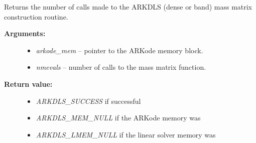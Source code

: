 \documentclass[letterpaper,10pt,english]{sphinxmanual}
\begin{document}
\begin{fulllineitems}
\label{c_interface/User_callable:ARKDlsGetNumMassEvals}
Returns the number of calls made to the ARKDLS
(dense or band) mass matrix construction routine.
\begin{description}
\item[{\textbf{Arguments:}}] \leavevmode\begin{itemize}
\item {} 
\emph{arkode\_mem} -- pointer to the ARKode memory block.

\item {} 
\emph{nmevals} -- number of calls to the mass matrix function.

\end{itemize}

\item[{\textbf{Return value:}}] \leavevmode\begin{itemize}
\item {} 
\emph{ARKDLS\_SUCCESS} if successful

\item {} 
\emph{ARKDLS\_MEM\_NULL} if the ARKode memory was 

\item {} 
\emph{ARKDLS\_LMEM\_NULL} if the linear solver memory was 

\end{itemize}

\end{description}

\end{fulllineitems}

\end{document}
